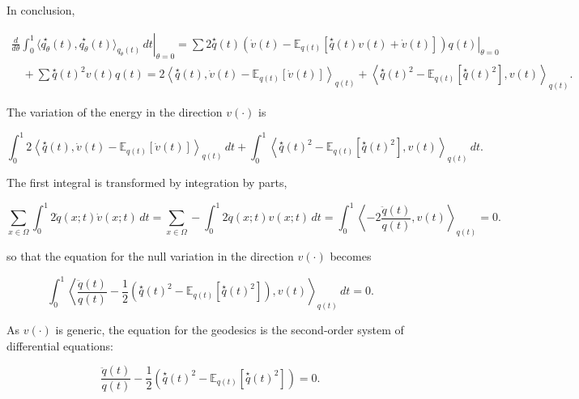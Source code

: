 \documentclass[axioms,article,submit,pdftex,moreauthors]{Definitions/mdpi}
\theoremstyle{plain}
\theoremstyle{remark}
\begin{document}
In conclusion,

\begin{multline*}
        \left. \frac{d}{d\theta} \int_0^1 \langle \overset{\star}{q_\theta}(t), \overset{\star}{q_\theta}(t) \rangle_{q_\theta(t)} \, dt \right|_{\theta=0} 
    = \left. \sum 2 \overset{\star}{q}(t) \left( \dot{v}(t) - \mathbb{E}_{q(t)} [\overset{\star}{q}(t) v(t) + \dot{v}(t)] \right) q(t) \right|_{\theta=0} \\
    \quad + \sum \overset{\star}{q}(t)^2 v(t) q(t) 
    = 2 \left\langle \overset{\star}{q}(t), \dot{v}(t) - \mathbb{E}_{q(t)} [\dot{v}(t)] \right\rangle_{q(t)} + \left\langle \overset{\star}{q}(t)^2 - \mathbb{E}_{q(t)} [\overset{\star}{q}(t)^2], v(t) \right\rangle_{q(t)}.
\end{multline*}

The variation of the energy in the direction \( v(\cdot) \) is

\begin{equation*} 
\int_0^1 2 \left\langle \overset{\star}{q}(t), \dot{v}(t) - \mathbb{E}_{q(t)} [\dot{v}(t)] \right\rangle_{q(t)} \, dt + \int_0^1 \left\langle \overset{\star}{q}(t)^2 - \mathbb{E}_{q(t)} [\overset{\star}{q}(t)^2], v(t) \right\rangle_{q(t)} \, dt.
\end{equation*} 

The first integral is transformed by integration by parts,

\begin{equation*} 
\sum_{x \in \Omega} \int_0^1 2 \dot{q}(x; t) \dot{v}(x; t) \, dt = \sum_{x \in \Omega} -\int_0^1 2 \ddot{q}(x; t) v(x; t) \, dt = \int_0^1 \left\langle -2 \frac{\ddot{q}(t)}{q(t)}, v(t) \right\rangle_{q(t)} = 0.
\end{equation*} 

so that the equation for the null variation in the direction \( v(\cdot) \) becomes

\begin{equation*} 
\int_0^1 \left\langle \frac{\ddot{q}(t)}{q(t)} - \frac{1}{2} \left( \overset{\star}{q}(t)^2 - \mathbb{E}_{q(t)} [\overset{\star}{q}(t)^2] \right), v(t) \right\rangle_{q(t)} \, dt = 0.
\end{equation*} 

As \( v(\cdot) \) is generic, the equation for the geodesics is the second-order system of differential equations:

\begin{equation*} 
\frac{\ddot{q}(t)}{q(t)} - \frac{1}{2} \left( \overset{\star}{q}(t)^2 - \mathbb{E}_{q(t)} \left[\overset{\star}{q}(t)^2 \right] \right) = 0.
\end{equation*} 
\end{document}
